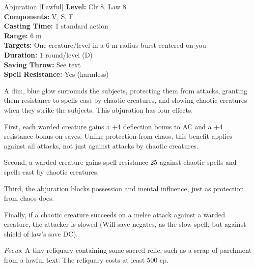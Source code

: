 {Abjuration [Lawful]}
{
	\textbf{Level:}
	Clr 8, Law 8\\
	\textbf{Components:}
	V, S, F\\
	\textbf{Casting Time:}
	1 standard action\\
	\textbf{Range:}
	6 m\\
	\textbf{Targets:}
	One creature/level in a 6-m-radius burst centered on you\\
	\textbf{Duration:}
	1 round/level (D)\\
	\textbf{Saving Throw:}
	See text\\
	\textbf{Spell Resistance:}
	Yes (harmless)\\
}
{
	A dim, blue glow surrounds the subjects, protecting them from attacks, granting them resistance to spells cast by chaotic creatures, and slowing chaotic creatures when they strike the subjects. This abjuration has four effects.

	First, each warded creature gains a +4 deflection bonus to AC and a +4 resistance bonus on saves. Unlike protection from chaos, this benefit applies against all attacks, not just against attacks by chaotic creatures.

	Second, a warded creature gains spell resistance 25 against chaotic spells and spells cast by chaotic creatures.

	Third, the abjuration blocks possession and mental influence, just as protection from chaos does.

	Finally, if a chaotic creature succeeds on a melee attack against a warded creature, the attacker is slowed (Will save negates, as the slow spell, but against shield of law's save DC).

	\textit{Focus}:
	A tiny reliquary containing some sacred relic, such as a scrap of parchment from a lawful text. The reliquary costs at least 500 cp.

}
